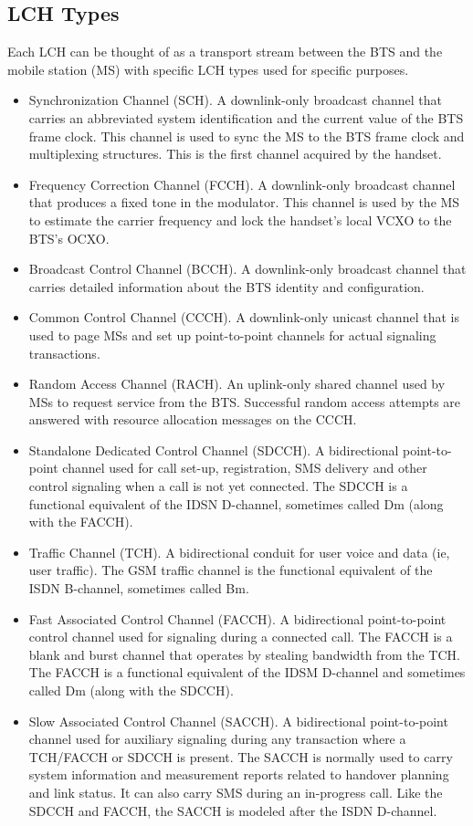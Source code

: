 \documentclass[11pt]{book}
\begin{document}
\subsection{LCH Types}
Each LCH can be thought of as a transport stream between the BTS and the mobile station (MS) with specific LCH types used for specific purposes.
\begin{itemize}
	\item Synchronization Channel (SCH). A downlink-only broadcast channel that carries an abbreviated system identification and the current value of the BTS frame clock. This channel is used to sync the MS to the BTS frame clock and multiplexing structures.  This is the first channel acquired by the handset.
	\item Frequency Correction Channel (FCCH). A downlink-only broadcast channel that produces a fixed tone in the modulator. This channel is used by the MS to estimate the carrier frequency and lock the handset's local VCXO to the BTS's OCXO.
	\item Broadcast Control Channel (BCCH). A downlink-only broadcast channel that carries detailed information about the BTS identity and configuration.
	\item Common Control Channel (CCCH). A downlink-only unicast channel that is used to page MSs and set up point-to-point channels for actual signaling transactions.
	\item Random Access Channel (RACH). An uplink-only shared channel used by MSs to request service from the BTS. Successful random access attempts are answered with resource allocation messages on the CCCH.
	\item Standalone Dedicated Control Channel (SDCCH). A bidirectional point-to-point channel used for call set-up, registration, SMS delivery and other control signaling when a call is not yet connected.  The SDCCH is a functional equivalent of the IDSN D-channel, sometimes called Dm (along with the FACCH).
	\item Traffic Channel (TCH). A bidirectional conduit for user voice and data (ie, user traffic).  The GSM traffic channel is the functional equivalent of the ISDN B-channel, sometimes called Bm.
	\item Fast Associated Control Channel (FACCH). A bidirectional point-to-point control channel used for signaling during a connected call. The FACCH is a blank and burst channel that operates by stealing bandwidth from the TCH.  The FACCH is a functional equivalent of the IDSM D-channel and sometimes called Dm (along with the SDCCH).
	\item Slow Associated Control Channel (SACCH).  A bidirectional point-to-point channel used for auxiliary signaling during any transaction where a TCH/FACCH or SDCCH is present.  The SACCH is normally used to carry system information and measurement reports related to handover planning and link status.  It can also carry SMS during an in-progress call.  Like the SDCCH and FACCH, the SACCH is modeled after the ISDN D-channel.
\end{itemize}
\end{document}
